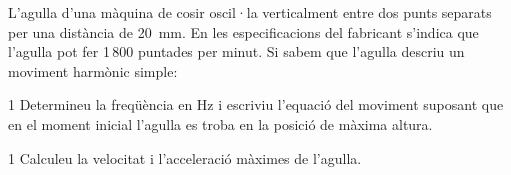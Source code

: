 L'agulla d'una màquina de cosir oscil·la verticalment entre dos punts separats per una distància de 20~mm. En les especificacions del fabricant s'indica que l'agulla pot fer 1\,800 puntades per minut. Si sabem que l'agulla descriu un moviment harmònic simple:


\begin{apartat}{1}
Determineu la freqüència en Hz i escriviu l'equació del moviment suposant que en el moment inicial l'agulla es troba en la posició de màxima altura.
\end{apartat}

\begin{apartat}{1}
Calculeu la velocitat i l'acceleració màximes de l'agulla.
\end{apartat}

